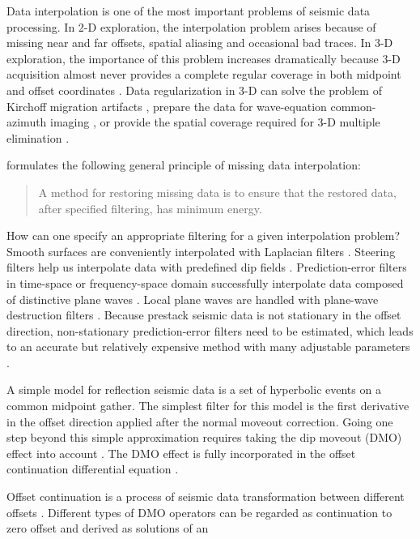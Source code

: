 Data interpolation is one of the most important problems of seismic
data processing. In 2-D exploration, the interpolation problem arises
because of missing near and far offsets, spatial aliasing and
occasional bad traces. In 3-D exploration, the importance of this
problem increases dramatically because 3-D acquisition almost never
provides a complete regular coverage in both midpoint and offset
coordinates \cite{Biondi.3dsi.99}. Data regularization in 3-D can
solve the problem of Kirchoff migration artifacts \cite{gardnerSEG},
prepare the data for wave-equation common-azimuth imaging
\cite{comaz}, or provide the spatial coverage required for 3-D
multiple elimination \cite{delft}.
\par
{} formulates the following general
principle of missing data interpolation:
\begin{quote}
  A method for restoring missing data is to ensure that the restored
  data, after specified filtering, has minimum energy.
\end{quote}
How can one specify an appropriate filtering for a given interpolation
problem? Smooth surfaces are conveniently interpolated with Laplacian
filters \cite{GEO39.01.00390048}. Steering filters help us
interpolate data with predefined dip fields
\cite{clappSEG}.
Prediction-error filters in time-space or frequency-space domain
successfully interpolate data composed of distinctive plane waves
\cite{GEO56.06.07850794,gee}. Local plane waves are handled with plane-wave destruction filters \cite{pwd}.
Because prestack seismic data is not
stationary in the offset direction, non-stationary prediction-error
filters need to be estimated, which leads to an accurate but
relatively expensive method with many adjustable parameters
\cite{crawleySEG}.
\par
A simple model for reflection seismic data is a set of hyperbolic
events on a common midpoint gather. The simplest filter for this model
is the first derivative in the offset direction applied after the
normal moveout correction. Going one step beyond
this simple approximation requires taking the dip moveout (DMO) effect
into account \cite{FBR04.07.00070024}. The DMO effect is fully
incorporated in the offset continuation differential equation
\cite{me,ofcon1}.
\par
Offset continuation is a process of seismic data transformation
between different offsets
\cite{GPR29.03.03740406,GPR30.06.08130828,GPR30.06.08290849}.
Different types of DMO operators \cite{dmo} can be regarded as
continuation to zero offset and derived as solutions of an

